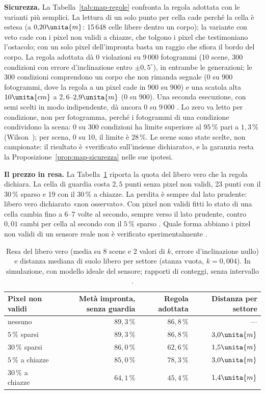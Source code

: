 \textbf{Sicurezza.} La Tabella~\ref{tab:map-regole} confronta la regola adottata con le varianti più semplici. La lettura di un solo punto per cella cade perché la cella è estesa (a $0{,}20\unita{m}$: 15\,648 celle libere dentro un corpo); la variante con veto cade con i pixel non validi a chiazze, che tolgono i pixel che testimoniano l'ostacolo; con un solo pixel dell'impronta basta un raggio che sfiora il bordo del corpo. La regola adottata dà 0 violazioni su 9\,000 fotogrammi (10 scene, 300 condizioni con errore d'inclinazione entro $\pm0{,}5^\circ$), in entrambe le generazioni; le 300 condizioni comprendono un corpo che non rimanda segnale (0 su 900 fotogrammi, dove la regola a un pixel cade in 900 su 900) e una scatola alta $10\unita{cm}$ a $2{,}6$–$2{,}9\unita{m}$ (0 su 900). Una seconda esecuzione, con semi scelti in modo indipendente, dà ancora 0 su 9\,000 . Lo zero va letto per condizione, non per fotogramma, perché i fotogrammi di una condizione condividono la scena: 0 su 300 condizioni ha limite superiore al $95\,\%$ pari a $1{,}3\,\%$ (Wilson~\cite{wilson1927}); per scena, 0 su 10, il limite è $28\,\%$. Le scene sono state scelte, non campionate: il risultato è «verificato sull'insieme dichiarato», e la garanzia resta la Proposizione~\ref{prop:map-sicurezza} nelle sue ipotesi.

\textbf{Il prezzo in resa.} La Tabella~\ref{tab:map-resa} riporta la quota del libero vero che la regola dichiara. La cella di guardia costa $2{,}5$ punti senza pixel non validi, 23 punti con il $30\,\%$ sparso e 19 con il $30\,\%$ a chiazze. La perdita è sempre dal lato prudente: libero vero dichiarato «non osservato». Con pixel non validi fitti lo stato di una cella cambia fino a 6–7 volte al secondo, sempre verso il lato prudente, contro $0{,}01$ cambi per cella al secondo con il $5\,\%$ sparso . Quale forma abbiano i pixel non validi di un sensore reale non è verificato sperimentalmente .

\begin{table}[t]\centering\small
\caption{Resa del libero vero (media su 8 scene e 2 valori di $k$, errore d'inclinazione nullo) e distanza mediana di suolo libero per settore (stanza vuota, $k=0{,}004$). In simulazione, con modello ideale del sensore; rapporti di conteggi, senza intervallo .}\label{tab:map-resa}
\begin{tabular}{lrrr}
\toprule
Pixel non validi & Metà impronta, senza guardia & Regola adottata & Distanza per settore\\
\midrule
nessuno & $89{,}3\,\%$ & $86{,}8\,\%$ & —\\
$5\,\%$ sparsi & $89{,}3\,\%$ & $86{,}8\,\%$ & $3{,}0\unita{m}$\\
$30\,\%$ sparsi & $86{,}0\,\%$ & $62{,}6\,\%$ & $1{,}5\unita{m}$\\
$5\,\%$ a chiazze & $85{,}0\,\%$ & $78{,}3\,\%$ & $3{,}0\unita{m}$\\
$30\,\%$ a chiazze & $64{,}1\,\%$ & $45{,}4\,\%$ & $1{,}4\unita{m}$\\
\bottomrule
\end{tabular}
\end{table}

